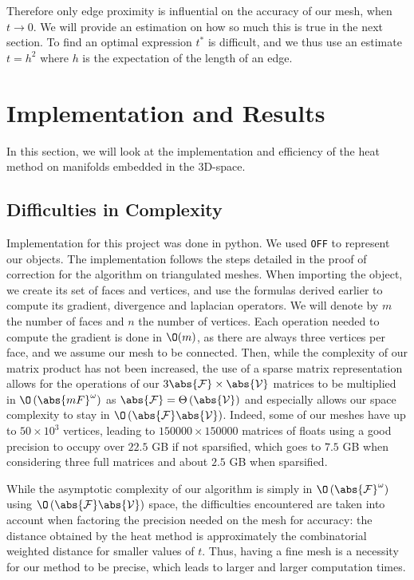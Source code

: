 \documentclass[math, info, english]{cours}
\def\mF{\mathcal{F}}
\def\mV{\mathcal{V}}
\begin{document}
Therefore only edge proximity is influential on the accuracy of our mesh, when $t \to 0$.
We will provide an estimation on how so much this is true in the next section.
To find an optimal expression $t^{*}$ is difficult, and we thus use an estimate $t = h^{2}$ where $h$ is the expectation of the length of an edge.

\section{Implementation and Results}
In this section, we will look at the implementation and efficiency of the heat method on manifolds embedded in the 3D-space.

\subsection{Difficulties in Complexity}
Implementation for this project was done in python. We used \texttt{OFF} to represent our objects.
The implementation follows the steps detailed in the proof of correction for the algorithm on triangulated meshes.
When importing the object, we create its set of faces and vertices, and use the formulas derived earlier to compute its gradient, divergence and laplacian operators.
We will denote by $m$ the number of faces and $n$ the number of vertices.
Each operation needed to compute the gradient is done in $\O(m)$, as there are always three vertices per face, and we assume our mesh to be connected.
Then, while the complexity of our matrix product has not been increased, the use of a sparse matrix representation allows for the operations of our $3\abs{\mF} \times \abs{\mV}$ matrices to be multiplied in $\O\left( \abs{mF}^{\omega} \right)$ as $\abs{\mF} = \Theta\left( \abs{\mV} \right)$ and especially allows our space complexity to stay in $\O\left( \abs{\mF}\abs{\mV} \right)$.
Indeed, some of our meshes have up to $50\times 10^{3}$ vertices, leading to $150000 \times 150000$ matrices of floats using a good precision to occupy over $22.5$ GB if not sparsified, which goes to $7.5$ GB when considering three full matrices and about $2.5$ GB when sparsified.

While the asymptotic complexity of our algorithm is simply in $\O\left( \abs{\mF}^{\omega} \right)$ using $\O\left( \abs{\mF}\abs{\mV} \right)$ space, the difficulties encountered are taken into account when factoring the precision
needed on the mesh for accuracy: the distance obtained by the heat method is approximately the combinatorial weighted distance for smaller values of $t$.
Thus, having a fine mesh is a necessity for our method to be precise, which leads to larger and larger computation times.
\end{document}
